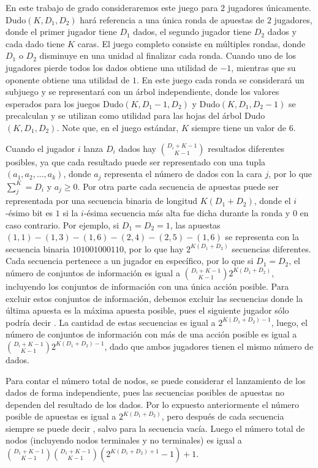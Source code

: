 En este trabajo de grado consideraremos este juego para $2$ jugadores únicamente. Dudo$(K, D_1, D_2)$ hará referencia a una única ronda de apuestas de $2$ jugadores, donde el primer jugador tiene $D_1$ dados, el segundo jugador tiene $D_2$ dados y cada dado tiene $K$ caras. El juego completo consiste en múltiples rondas, donde $D_1$ o $D_2$ disminuye en una unidad al finalizar cada ronda. Cuando uno de los jugadores pierde todos los dados obtiene una utilidad de $-1$, mientras que su oponente obtiene una utilidad de $1$. En este juego cada ronda se considerará un subjuego y se representará con un árbol independiente, donde los valores esperados para los juegos Dudo$(K, D_1 - 1, D_2)$ y Dudo$(K, D_1, D_2 - 1)$ se precalculan y se utilizan como utilidad para las hojas del árbol Dudo$(K, D_1, D_2)$. Note que, en el juego estándar, $K$ siempre tiene un valor de $6$.

Cuando el jugador $i$ lanza $D_i$ dados hay $\binom{D_i+K-1}{K-1}$ resultados diferentes posibles, ya que cada resultado puede ser representado con una tupla $(a_1, a_2, ..., a_k)$, donde $a_j$ representa el número de dados con la cara $j$, por lo que $\sum_j^K = D_i$ y $a_j \geq 0$. Por otra parte cada secuencia de apuestas puede ser representada por una secuencia binaria de longitud $K(D_1 + D_2)$, donde el $i$-ésimo bit es $1$ si la $i$-ésima secuencia más alta fue dicha durante la ronda y $0$ en caso contrario. Por ejemplo, si $D_1 = D_2 = 1$, las apuestas $(1, 1)-(1, 3)-(1, 6)-(2, 4)-(2, 5)-(1, 6)$ se representa con la secuencia binaria $101001000110$, por lo que hay $2^{K(D_1 + D_2)}$ secuencias diferentes. Cada secuencia pertenece a un jugador en específico, por lo que si $D_1 = D_2$, el número de conjuntos de información  es igual a  $\binom{D_i+K-1}{K-1}2^{K(D_1 + D_2)}$, incluyendo los conjuntos de información con una única acción posible. Para excluir estos conjuntos de información, debemos excluir las secuencias donde la última apuesta es la máxima apuesta posible, pues el siguiente jugador sólo podría decir . La cantidad de estas secuencias es igual a $2^{K(D_1 + D_2)-1}$, luego, el número de conjuntos de información con más de una acción posible es igual a $\binom{D_i+K-1}{K-1}2^{K(D_1 + D_2)-1}$, dado que ambos jugadores tienen el mismo número de dados.

Para contar el número total de nodos, se puede considerar el lanzamiento de los dados de forma independiente, pues las secuencias posibles de apuestas no dependen del resultado de los dados. Por lo expuesto anteriormente el número posible de apuestas es igual a $2^{K(D_1+D_2)}$, pero después de cada secuencia siempre se puede decir , salvo para la secuencia vacía. Luego el número total de nodos (incluyendo nodos terminales y no terminales) es igual a $\binom{D_1+K-1}{K-1}\binom{D_1+K-1}{K-1}(2^{K(D_1+D_2)+1}-1)+1$.

